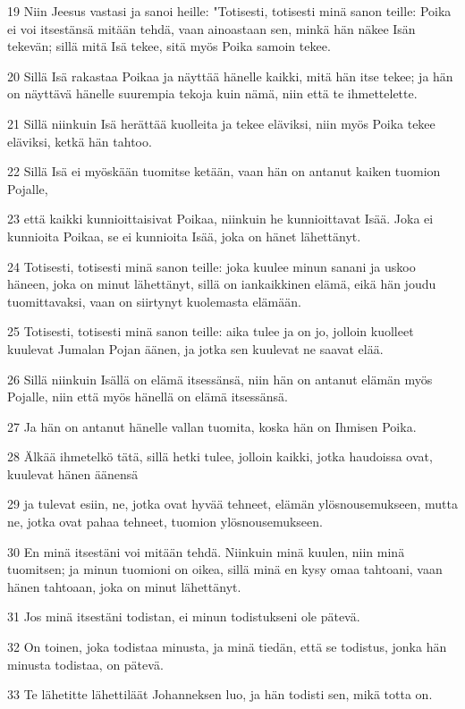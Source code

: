 \par 19 Niin Jeesus vastasi ja sanoi heille: "Totisesti, totisesti minä sanon teille: Poika ei voi itsestänsä mitään tehdä, vaan ainoastaan sen, minkä hän näkee Isän tekevän; sillä mitä Isä tekee, sitä myös Poika samoin tekee.
\par 20 Sillä Isä rakastaa Poikaa ja näyttää hänelle kaikki, mitä hän itse tekee; ja hän on näyttävä hänelle suurempia tekoja kuin nämä, niin että te ihmettelette.
\par 21 Sillä niinkuin Isä herättää kuolleita ja tekee eläviksi, niin myös Poika tekee eläviksi, ketkä hän tahtoo.
\par 22 Sillä Isä ei myöskään tuomitse ketään, vaan hän on antanut kaiken tuomion Pojalle,
\par 23 että kaikki kunnioittaisivat Poikaa, niinkuin he kunnioittavat Isää. Joka ei kunnioita Poikaa, se ei kunnioita Isää, joka on hänet lähettänyt.
\par 24 Totisesti, totisesti minä sanon teille: joka kuulee minun sanani ja uskoo häneen, joka on minut lähettänyt, sillä on iankaikkinen elämä, eikä hän joudu tuomittavaksi, vaan on siirtynyt kuolemasta elämään.
\par 25 Totisesti, totisesti minä sanon teille: aika tulee ja on jo, jolloin kuolleet kuulevat Jumalan Pojan äänen, ja jotka sen kuulevat ne saavat elää.
\par 26 Sillä niinkuin Isällä on elämä itsessänsä, niin hän on antanut elämän myös Pojalle, niin että myös hänellä on elämä itsessänsä.
\par 27 Ja hän on antanut hänelle vallan tuomita, koska hän on Ihmisen Poika.
\par 28 Älkää ihmetelkö tätä, sillä hetki tulee, jolloin kaikki, jotka haudoissa ovat, kuulevat hänen äänensä
\par 29 ja tulevat esiin, ne, jotka ovat hyvää tehneet, elämän ylösnousemukseen, mutta ne, jotka ovat pahaa tehneet, tuomion ylösnousemukseen.
\par 30 En minä itsestäni voi mitään tehdä. Niinkuin minä kuulen, niin minä tuomitsen; ja minun tuomioni on oikea, sillä minä en kysy omaa tahtoani, vaan hänen tahtoaan, joka on minut lähettänyt.
\par 31 Jos minä itsestäni todistan, ei minun todistukseni ole pätevä.
\par 32 On toinen, joka todistaa minusta, ja minä tiedän, että se todistus, jonka hän minusta todistaa, on pätevä.
\par 33 Te lähetitte lähettiläät Johanneksen luo, ja hän todisti sen, mikä totta on.
